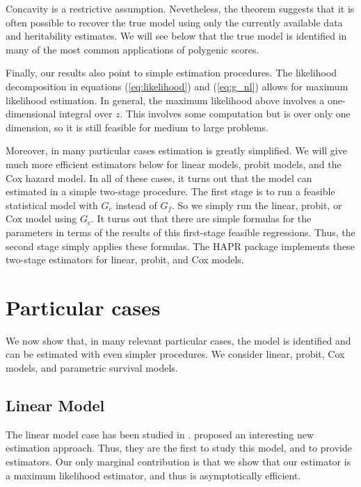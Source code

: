 \documentclass[12pt]{article}
\begin{document}
Concavity is a restrictive assumption. Nevetheless, the theorem suggests that it is often possible to recover the true model using only the currently available data and heritability estimates. We will see below that the true model is identified in many of the most common applications of polygenic scores.

Finally, our results also point to simple estimation procedures. The likelihood decomposition in equations (\ref{eq:likelihood}) and (\ref{eq:g_nl}) allows for maximum likelihood estimation. In general, the maximum likelihood above involves a one-dimensional integral over $z$. This involves some computation but is over only one dimension, so it is still feasible for medium to large problems.

Moreover, in many particular cases estimation is greatly simplified. We will give much more efficient estimators below for linear models, probit models, and the Cox hazard model. In all of these cases, it turns out that the model can estimated in a simple two-stage procedure. The first stage is to run a feasible statistical model with $G_c$ instead of $G_f$. So we simply run the linear, probit, or Cox model using $G_c$. It turns out that there are simple formulas for the parameters in terms of the results of this first-stage feasible regressions. Thus, the second stage simply applies these formulas. The HAPR package implements these two-stage estimators for linear, probit, and Cox models.


\section{Particular cases}
We now show that, in many relevant particular cases, the model is identified and can be estimated with even simpler procedures. We consider linear, probit, Cox models, and parametric survival models.


\subsection{Linear Model}
The linear model case has been studied in \textcite{becker_2021_pgirepo}. \textcite{van_kippersluis_oriv_2023} proposed an interesting new estimation approach. Thus, they are the first to study this model, and to provide estimators. Our only marginal contribution is that we show that our estimator is a maximum likelihood estimator, and thus is asymptotically efficient.
\end{document}
